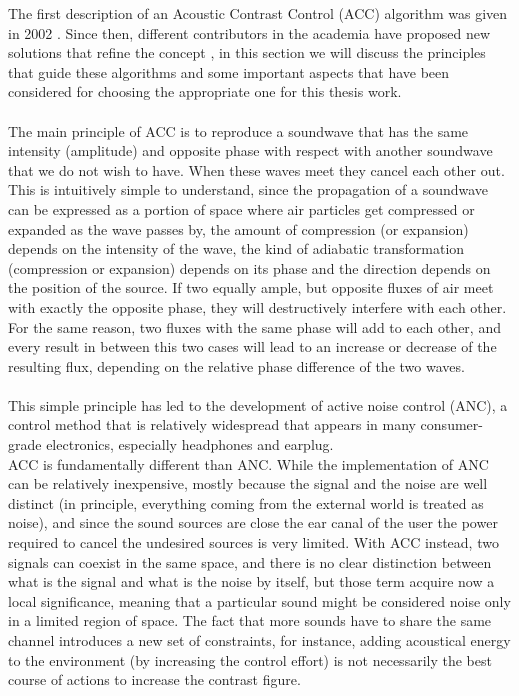 The first description of an Acoustic Contrast Control (ACC) algorithm was given in 2002 \parencite{choi_generation_2002}. Since then, different contributors in the academia have proposed new solutions that refine the concept \parencite{elliott_robustness_2012,cai_time-domain_2014}, in this section we will discuss the principles that guide these algorithms and some important aspects that have been considered for choosing the appropriate one for this thesis work.
\\
\\
The main principle of ACC is to reproduce a soundwave that has the same intensity (amplitude) and opposite phase with respect with another soundwave that we do not wish to have. When these waves meet they cancel each other out. This is intuitively simple to understand, since the propagation of a soundwave can be expressed as a portion of space where air particles get compressed or expanded as the wave passes by, the amount of compression (or expansion) depends on the intensity of the wave, the kind of adiabatic transformation (compression or expansion) depends on its phase and the direction depends on the position of the source. If two equally ample, but opposite fluxes of air meet with exactly the opposite phase, they will destructively interfere with each other. For the same reason, two fluxes with the same phase will add to each other, and every result in between this two cases will lead to an increase or decrease of the resulting flux, depending on the relative phase difference of the two waves.
\\
\\
This simple principle has led to the development of active noise control (ANC), a control method that is relatively widespread that appears in many consumer-grade electronics, especially headphones and earplug.
\\
ACC is fundamentally different than ANC. While the implementation of ANC can be relatively inexpensive, mostly because the signal and the noise are well distinct (in principle, everything coming from the external world is treated as noise), and since the sound sources are close the ear canal of the user the power required to cancel the undesired sources is very limited. With ACC instead, two signals can coexist in the same space, and there is no clear distinction between what is the signal and what is the noise by itself, but those term acquire now a local significance, meaning that a particular sound might be considered noise only in a limited region of space. The fact that more sounds have to share the same channel introduces a new set of constraints, for instance, adding acoustical energy to the environment (by increasing the control effort) is not necessarily the best course of actions to increase the contrast figure.
